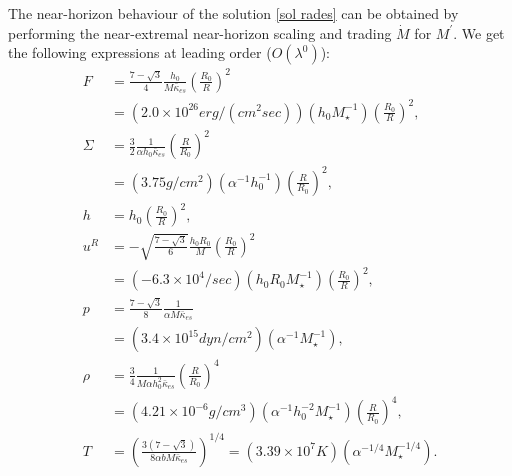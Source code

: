 \documentclass[a4paper,fleqn,usenatbib]{mnrasMOD}
\numberwithin{equation}{section}
\begin{document}

The near-horizon behaviour of the solution \eqref{sol rades} can be obtained by performing the near-extremal near-horizon scaling and trading $\dot M$ for $M^\prime$. We get the following expressions at leading order ($O(\lambda^0)$): 
\begin{subequations} \label{NHEK sol rades}
	\begin{align}
		F &= \frac{7-\sqrt{3}}{4} \frac{h_0}{M \bar{\kappa}_{es}} \left(\frac{R_{0}}{R}\right)^2 \label{F scaling}\\
		&= \left(2.0 \times 10^{26} erg/(cm^2 sec)\right)\left(h_0 M_{\star}^{-1}\right)\left(\frac{R_{0}}{R}\right)^2, \nonumber\\
		\Sigma &= \frac{3}{2}\frac{1}{\alpha h_0 \bar{\kappa}_{es}} \left(\frac{R}{R_{0}}\right)^2 \\
		&= \left(3.75 g/cm^2\right)\left(\alpha^{-1} h_{0}^{-1}\right) \left(\frac{R}{R_{0}}\right)^2, \nonumber\\
		h &=h_{0} \left(\frac{R_{0}}{R}\right)^2, \\
		u^{R} &= -\sqrt{\frac{7 - \sqrt{3}}{6}} \frac{h_0 R_0}{M} \left(\frac{R_{0}}{R}\right)^2 \\ 
		&= \left(-6.3 \times 10^{4} /sec\right)\left(h_0 R_{0} M_{\star}^{-1}\right) \left(\frac{R_{0}}{R}\right)^2, \nonumber \\
		p &= \frac{7 - \sqrt{3}}{8} \frac{1}{\alpha M \bar{\kappa}_{es}}  \\
		&=  \left(3.4 \times 10^{15} dyn/cm^2 \right)\left(\alpha^{-1} M_{\star}^{-1}\right), \nonumber\\
		\rho &= \frac{3}{4}\frac{1}{M \alpha h_0^2 \bar{\kappa}_{es}} \left(\frac{R}{R_0}\right)^4 \\
		&= \left(4.21 \times 10^{-6} g/cm^3 \right)\left(\alpha^{-1} h_{0}^{-2}M_{\star}^{-1}\right)  \left(\frac{R}{R_0}\right)^4, \nonumber\\
		T &= \left(\frac{3(7 - \sqrt{3})}{8\alpha b M \bar{\kappa}_{es}}\right)^{1/4} = \left(3.39 \times 10^{7} K \right)\left(\alpha^{-1/4} M_{\star}^{-1/4}\right). \label{Tnear}
	\end{align}
\end{subequations}
\end{document}
